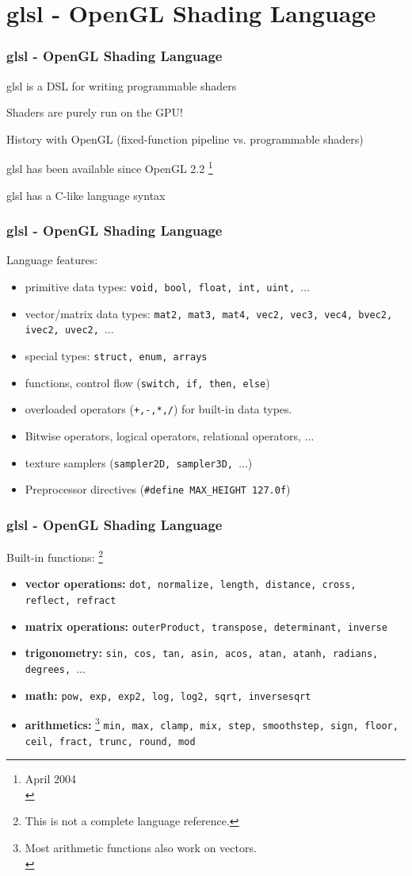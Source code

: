 \documentclass{beamer}
\begin{document}
%
%
%
\section{glsl - OpenGL Shading Language}

\begin{frame}
\frametitle{glsl - OpenGL Shading Language}
glsl is a DSL for writing programmable shaders

Shaders are purely run on the GPU!

History with OpenGL (fixed-function pipeline vs. programmable shaders)

glsl has been available since OpenGL 2.2
\footnote{April 2004\\}

glsl has a C-like language syntax
\end{frame}


%
%
%
\begin{frame}
\frametitle{glsl - OpenGL Shading Language}
Language features:

\begin{itemize}
\item primitive data types: \texttt{void, bool, float, int, uint, $\ldots$}
\item vector/matrix data types: \texttt{mat2, mat3, mat4, vec2, vec3, vec4,
bvec2, ivec2, uvec2, $\ldots$}
\item special types: \texttt{struct, enum, arrays}
\item functions, control flow (\texttt{switch, if, then, else})
\item overloaded operators (\texttt{+,-,*,/}) for built-in data types.
\item Bitwise operators, logical operators, relational operators, $\ldots$
\item texture samplers (\texttt{sampler2D, sampler3D, $\ldots$})
\item Preprocessor directives (\texttt{\#define MAX\_HEIGHT 127.0f})
\end{itemize}
\end{frame}


%
%
%
\begin{frame}
\frametitle{glsl - OpenGL Shading Language}
Built-in functions:
\footnote{This is not a complete language reference.}

\begin{itemize}
\item \textbf{vector operations:}
\texttt{dot, normalize, length, distance, cross, reflect, refract}
\item \textbf{matrix operations:}
\texttt{outerProduct, transpose, determinant, inverse}
\item \textbf{trigonometry:}
\texttt{sin, cos, tan, asin, acos, atan, atanh, radians, degrees, $\ldots$}
\item \textbf{math:}
\texttt{pow, exp, exp2, log, log2, sqrt, inversesqrt}
\item \textbf{arithmetics:}
\footnote{Most arithmetic functions also work on vectors.\\}
\texttt{min, max, clamp, mix, step, smoothstep,
sign, floor, ceil, fract, trunc, round, mod}
\end{itemize}
\end{frame}
\end{document}
